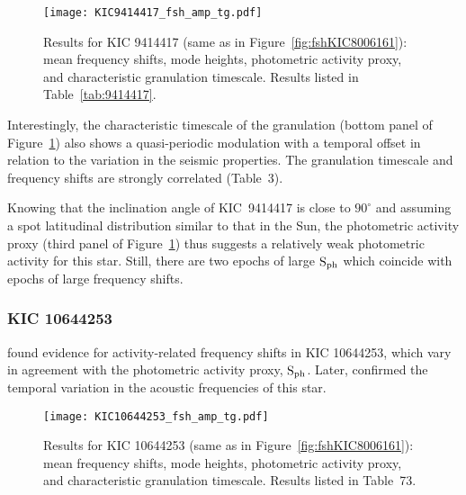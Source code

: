 \documentclass[twocolumn]{aastex61}%
\begin{document}
\begin{figure}[h]
\texttt{[image: KIC9414417\_fsh\_amp\_tg.pdf]}
\caption{Results for KIC 9414417 (same as in Figure~\ref{fig:fshKIC8006161}): mean frequency shifts, mode heights, photometric activity proxy, and characteristic granulation timescale. Results listed in Table~\ref{tab:9414417}.}\label{fig:KIC9414417}
\end{figure}

Interestingly, the characteristic timescale of the granulation (bottom panel of Figure~\ref{fig:KIC9414417}) also shows a quasi-periodic modulation with a temporal offset in relation to the variation in the seismic properties. The granulation timescale and frequency shifts are strongly correlated (Table~3).%

Knowing that the inclination angle of KIC~9414417 is close to $90^\circ$ \citep[e.g.][]{Campante2016} and assuming a spot latitudinal distribution similar to that in the Sun, the photometric activity proxy (third panel of Figure~\ref{fig:KIC9414417}) thus suggests a relatively weak photometric activity for this star. Still, there are two epochs of large $\rm S_{\rm ph}$ which coincide with epochs of large frequency shifts.\vfill

\subsubsection{KIC 10644253}

\citet{Salabert2016} found evidence for activity-related frequency shifts in KIC 10644253, which vary in agreement with the photometric activity proxy, $\rm S_{\rm ph}$. Later, \citet{Kiefer2017} confirmed the temporal variation in the acoustic frequencies of this star.

\begin{figure}
\texttt{[image: KIC10644253\_fsh\_amp\_tg.pdf]}
\caption{Results for KIC 10644253 (same as in Figure~\ref{fig:fshKIC8006161}): mean frequency shifts, mode heights, photometric activity proxy, and characteristic granulation timescale. Results listed in Table~73.}\label{fig:KIC10644253}%
\end{figure}
\end{document}
